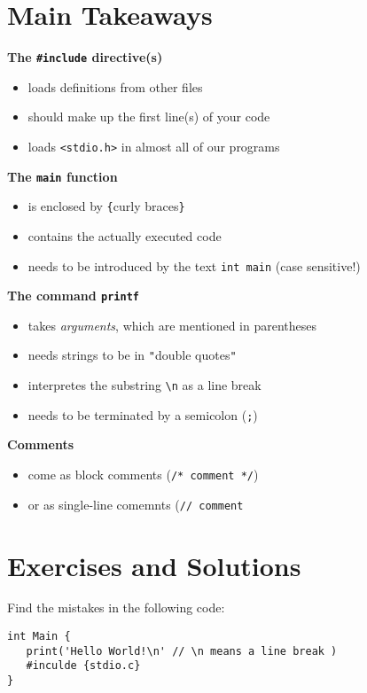 \section{Main Takeaways}
\begin{defbox}
\textbf{The \texttt{\#include} directive(s)}
\begin{itemize}
\item loads definitions from other files
\item should make up the first line(s) of your code
\item loads \texttt{<stdio.h>} in almost all of our programs
\end{itemize}

\textbf{The \texttt{main} function}
\begin{itemize}
\item is enclosed by \texttt{\{}curly braces\texttt{\}}
\item contains the actually executed code
\item needs to be introduced by the text \texttt{int main} (case sensitive!)
\end{itemize}
\end{defbox}
%
\begin{defbox}[]
\textbf{The command \texttt{printf}}
\begin{itemize}
\item takes \emph{arguments}, which are mentioned in parentheses
\item needs strings to be in \texttt{"}double quotes\texttt{"}
\item interpretes the substring \texttt{\textbackslash n} as a line break
\item needs to be terminated by a semicolon (\texttt{;})
\end{itemize}

\textbf{Comments}
\begin{itemize}
\item come as block comments (\texttt{/* comment */})
\item or as single-line comemnts (\texttt{// comment}
\end{itemize}
\end{defbox}

\newpage
\section{Exercises and Solutions}
Find the mistakes in the following code:
\begin{codebox}[exo2-1.c]
\begin{verbatim}
int Main {
   print('Hello World!\n' // \n means a line break )
   #inculde {stdio.c}
}
\end{verbatim}
\end{codebox}

